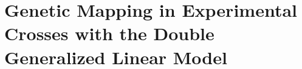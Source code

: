 \chapter{Genetic Mapping in Experimental Crosses with the Double Generalized Linear Model}

\lipsum[1]